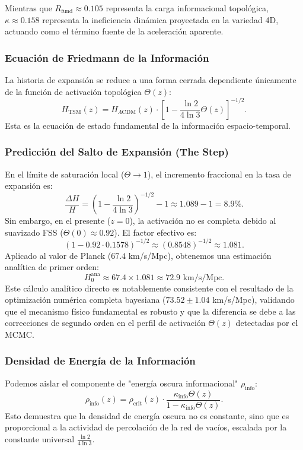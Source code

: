 \documentclass[11pt, a4paper]{article}
\theoremstyle{plain}
\theoremstyle{definition}
\begin{document}
Mientras que $R_{\text{fund}} \approx 0.105$ representa la carga informacional topológica, $\kappa \approx 0.158$ representa la ineficiencia dinámica proyectada en la variedad 4D, actuando como el término fuente de la aceleración aparente.

\subsubsection{Ecuación de Friedmann de la Información}
La historia de expansión se reduce a una forma cerrada dependiente únicamente de la función de activación topológica $\Theta(z)$:
\begin{equation}
H_{\text{TSM}}(z) = H_{\Lambda\text{CDM}}(z) \cdot \left[ 1 - \frac{\ln 2}{4\ln 3} \Theta(z) \right]^{-1/2}.
\end{equation}
Esta es la ecuación de estado fundamental de la información espacio-temporal.

\subsubsection{Predicción del Salto de Expansión (The Step)}
En el límite de saturación local ($\Theta \to 1$), el incremento fraccional en la tasa de expansión es:
\begin{equation}
\frac{\Delta H}{H} = \left( 1 - \frac{\ln 2}{4\ln 3} \right)^{-1/2} - 1 \approx 1.089 - 1 = 8.9\%.
\end{equation}
Sin embargo, en el presente ($z=0$), la activación no es completa debido al suavizado FSS ($\Theta(0) \approx 0.92$). El factor efectivo es:
\begin{equation}
\left( 1 - 0.92 \cdot 0.1578 \right)^{-1/2} \approx (0.8548)^{-1/2} \approx 1.081.
\end{equation}
Aplicado al valor de Planck ($67.4$ km/s/Mpc), obtenemos una estimación analítica de primer orden:
\begin{equation}
H_0^{\text{ana}} \approx 67.4 \times 1.081 \approx 72.9 \text{ km/s/Mpc}.
\end{equation}
Este cálculo analítico directo es notablemente consistente con el resultado de la optimización numérica completa bayesiana ($73.52 \pm 1.04$ km/s/Mpc), validando que el mecanismo físico fundamental es robusto y que la diferencia se debe a las correcciones de segundo orden en el perfil de activación $\Theta(z)$ detectadas por el MCMC.

\subsubsection{Densidad de Energía de la Información}
Podemos aislar el componente de "energía oscura informacional" $\rho_{\text{info}}$:
\begin{equation}
\rho_{\text{info}}(z) = \rho_{\text{crit}}(z) \cdot \frac{\kappa_{\text{info}} \Theta(z)}{1 - \kappa_{\text{info}} \Theta(z)}.
\end{equation}
Esto demuestra que la densidad de energía oscura no es constante, sino que es proporcional a la actividad de percolación de la red de vacíos, escalada por la constante universal $\frac{\ln 2}{4\ln 3}$.
\end{document}
